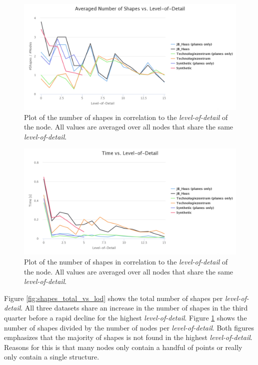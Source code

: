 \begin{figure}[h]
    \centering
    \includegraphics[width=1\textwidth]{Results/shapes_averaged_vs_lod.png}
    \caption{Plot of the number of shapes in correlation to the \textit{level-of-detail} of the node. All values are averaged over all nodes that share the same \textit{level-of-detail}.}
    \label{fig:shapes_averaged_vs_lod}
\end{figure}

\begin{figure}[h]
    \centering
    \includegraphics[width=1\textwidth]{Results/time_vs_lod.png}
    \caption{Plot of the number of shapes in correlation to the \textit{level-of-detail} of the node. All values are averaged over all nodes that share the same \textit{level-of-detail}.}
    \label{fig:time_vs_lod}
\end{figure}


Figure \ref{fig:shapes_total_vs_lod} shows the total number of shapes per \textit{level-of-detail}. All three datasets share an increase in the number of shapes in the third quarter before a rapid decline for the highest \textit{level-of-detail}. Figure \ref{fig:shapes_averaged_vs_lod} shows the number of shapes divided by the number of nodes per \textit{level-of-detail}. Both figures emphasizes that the majority of shapes is not found in the highest \textit{level-of-detail}. Reasons for this is that many nodes only contain a handful of points or really only contain a single structure. 
\\


